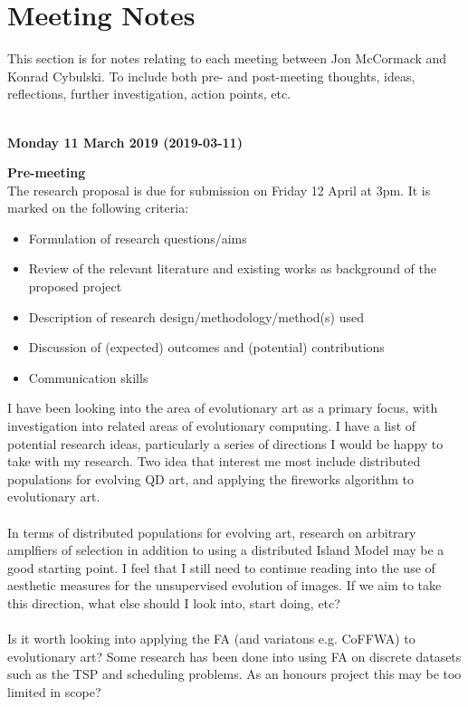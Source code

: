 \documentclass[10pt,a4paper]{article}
\begin{document}
\pagebreak

\section{Meeting Notes}

This section is for notes relating to each meeting between Jon McCormack and Konrad Cybulski. To include both pre- and post-meeting thoughts, ideas, reflections, further investigation, action points, etc.
\\\\

\begin{center} \textbf{Monday 11 March 2019 (2019-03-11)} \end{center} 
\textbf{Pre-meeting}
\\
The research proposal is due for submission on Friday 12 April at 3pm.
It is marked on the following criteria:
\begin{itemize}
	\item Formulation of research questions/aims
	\item Review of the relevant literature and existing works as background of the proposed project
	\item Description of research design/methodology/method(s) used
	\item Discussion of (expected) outcomes and (potential) contributions
	\item Communication skills
\end{itemize}
I have been looking into the area of evolutionary art as a primary focus, with investigation into related areas of evolutionary computing.
I have a list of potential research ideas, particularly a series of directions I would be happy to take with my research.
Two idea that interest me most include distributed populations for evolving QD art, and applying the fireworks algorithm to evolutionary art.
\\\\
In terms of distributed populations for evolving art, research on arbitrary amplfiers of selection \cite{graph-amplifiers} in addition to using a distributed Island Model \cite{distributed-evolutionary-art} may be a good starting point.
I feel that I still need to continue reading into the use of aesthetic measures for the unsupervised evolution of images.
If we aim to take this direction, what else should I look into, start doing, etc?
\\\\
Is it worth looking into applying the FA (and variatons e.g. CoFFWA) to evolutionary art?
Some research has been done into using FA on discrete datasets such as the TSP and scheduling problems.
As an honours project this may be too limited in scope?


\pagebreak



\end{document}
